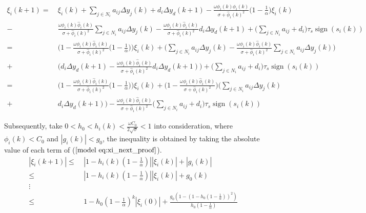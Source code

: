 \documentclass[journal,onecolumn]{IEEEtran}
\begin{document}
\begin{align}
    \label{model eq:xi_next_proof}
    \xi_i(k+1) = \ &  \xi_i(k) + \sum_{j \in N_i}a_{ij} \Delta y_j(k) + d_i \Delta y_d(k+1) - \frac{\omega \phi_i(k) \hat{\phi}_i(k)}{\sigma + \hat{\phi}_i(k)^2} \big(1 - \frac{1}{\alpha}\big) \xi_i(k) \quad \nonumber \\
    - \ & \frac{\omega \phi_i(k) \hat{\phi}_i(k)}{\sigma + \hat{\phi}_i(k)^2} \sum_{j \in N_i}a_{ij} \Delta y_j(k) - \frac{\omega \phi_i(k) \hat{\phi}_i(k)}{\sigma + \hat{\phi}_i(k)^2} d_i \Delta y_d(k+1) + \bigg( \sum_{j \in N_i}a_{ij} + d_i \bigg) \tau_s \operatorname{sign}(s_i(k)) \quad \nonumber \\
    = \ & \bigg( 1 - \frac{\omega \phi_i(k) \hat{\phi}_i(k)}{\sigma + \hat{\phi}_i(k)^2} \big(1 - \frac{1}{\alpha}\big) \bigg) \xi_i(k) + \bigg( \sum_{j \in N_i}a_{ij} \Delta y_j(k) - \frac{\omega \phi_i(k) \hat{\phi}_i(k)}{\sigma + \hat{\phi}_i(k)^2} \sum_{j \in N_i}a_{ij} \Delta y_j(k) \bigg) \quad \nonumber \\
    + \ & \bigg( d_i \Delta y_d(k+1) - \frac{\omega \phi_i(k) \hat{\phi}_i(k)}{\sigma + \hat{\phi}_i(k)^2} d_i \Delta y_d(k+1) \bigg) + \bigg( \sum_{j \in N_i}a_{ij} + d_i \bigg) \tau_s \operatorname{sign}(s_i(k)) \quad \nonumber \\
    = \ & \bigg( 1 - \frac{\omega \phi_i(k) \hat{\phi}_i(k)}{\sigma + \hat{\phi}_i(k)^2} \big(1 - \frac{1}{\alpha}\big) \bigg) \xi_i(k) + \bigg( 1 - \frac{\omega \phi_i(k) \hat{\phi}_i(k)}{\sigma + \hat{\phi}_i(k)^2} \bigg) \bigg( \sum_{j \in N_i}a_{ij} \Delta y_j(k)  \quad \nonumber \\
    + \ &  d_i \Delta y_d(k+1) \bigg) - \frac{\omega \phi_i(k) \hat{\phi}_i(k)}{\sigma + \hat{\phi}_i(k)^2} \bigg( \sum_{j \in N_i}a_{ij} + d_i \bigg) \tau_s \operatorname{sign}(s_i(k))
\end{align}

Subsequently, take $ 0<h_0<h_i(k)<\frac{\omega C_0}{2\sqrt{\sigma}}<1 $ into consideration, where $ \phi_i(k) < C_0 $ and $ |g_i(k)|<g_0 $, the inequality is obtained by taking the absolute value of each term of ($ \ref{model eq:xi_next_proof} $).
\begin{align}
    \label{model:absolute2}
    |\xi_i(k+1)| \leq \ & |1-h_i(k)(1-\frac{1}{ \alpha })| |\xi_i(k)| + |g_i(k)| \quad \nonumber \\
    \leq \ & |1-h_i(k)(1-\frac{1}{\alpha })| |\xi_i(k)| + g_0(k) \quad \nonumber \\
    \vdots \nonumber \\
    \leq \ & 1-h_0(1-\frac{1}{\alpha })^k |\xi_i(0)| + \frac{g_0(1-(1-h_0(1-\frac{1}{\alpha}))^2)}{h_0(1-\frac{1}{ \alpha})}
\end{align}
\end{document}
